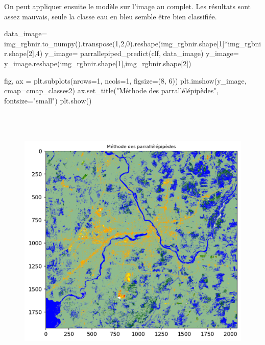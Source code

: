 \documentclass[
]{article}
\newenvironment{Shaded}{}{}
\newcommand{\DecValTok}[1]{\textcolor[rgb]{0.25,0.63,0.44}{#1}}
\newcommand{\NormalTok}[1]{#1}
\newcommand{\OperatorTok}[1]{\textcolor[rgb]{0.40,0.40,0.40}{#1}}
\newcommand{\StringTok}[1]{\textcolor[rgb]{0.25,0.44,0.63}{#1}}
\begin{document}
On peut appliquer ensuite le modèle sur l'image au complet. Les
résultats sont assez mauvais, seule la classe eau en bleu semble être
bien classifiée.

\label{5c2a30cc}
\label{cb22}
\begin{Shaded}
\begin{Highlighting}[]
\NormalTok{data\_image}\OperatorTok{=}\NormalTok{ img\_rgbnir.to\_numpy().transpose(}\DecValTok{1}\NormalTok{,}\DecValTok{2}\NormalTok{,}\DecValTok{0}\NormalTok{).reshape(img\_rgbnir.shape[}\DecValTok{1}\NormalTok{]}\OperatorTok{*}\NormalTok{img\_rgbnir.shape[}\DecValTok{2}\NormalTok{],}\DecValTok{4}\NormalTok{)}
\NormalTok{y\_image}\OperatorTok{=}\NormalTok{ parrallepiped\_predict(clf, data\_image)}
\NormalTok{y\_image}\OperatorTok{=}\NormalTok{ y\_image.reshape(img\_rgbnir.shape[}\DecValTok{1}\NormalTok{],img\_rgbnir.shape[}\DecValTok{2}\NormalTok{])}

\NormalTok{fig, ax }\OperatorTok{=}\NormalTok{ plt.subplots(nrows}\OperatorTok{=}\DecValTok{1}\NormalTok{, ncols}\OperatorTok{=}\DecValTok{1}\NormalTok{, figsize}\OperatorTok{=}\NormalTok{(}\DecValTok{8}\NormalTok{, }\DecValTok{6}\NormalTok{))}
\NormalTok{plt.imshow(y\_image, cmap}\OperatorTok{=}\NormalTok{cmap\_classes2)}
\NormalTok{ax.set\_title(}\StringTok{"Méthode des parrallélépipèdes"}\NormalTok{, fontsize}\OperatorTok{=}\StringTok{"small"}\NormalTok{)}
\NormalTok{plt.show()}
\end{Highlighting}
\end{Shaded}

\begin{figure}
\centering
\includegraphics[width=5.625in,height=5.22917in]{05-ClassificationsSupervisees_files/figure-html/cell-22-output-1.png}
\caption{}
\end{figure}
\end{document}
